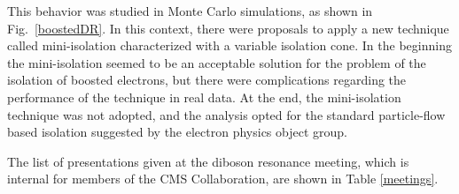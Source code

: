 This behavior was studied in Monte Carlo simulations, as shown in Fig.~\ref{boostedDR}. In this context, there were proposals to apply a new technique called mini-isolation characterized with a variable isolation cone. In the beginning the mini-isolation seemed to be an acceptable solution for the problem of the isolation of boosted electrons, but there were complications regarding the performance of the technique in real data. At the end, the mini-isolation technique was not adopted, and the analysis opted for the standard particle-flow based isolation suggested by the electron physics object group.

The list of presentations given at the diboson resonance meeting, which is internal for members of the CMS Collaboration, are shown in Table \ref{meetings}.  

\vspace{0.5cm}
